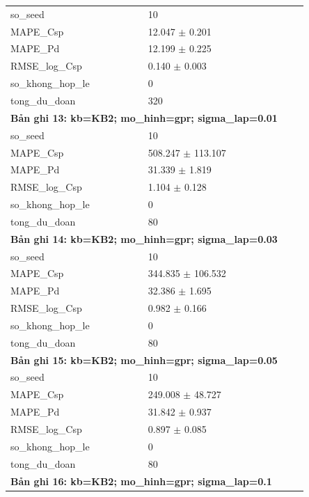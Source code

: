 \begin{longtable}{p{0.43\linewidth}p{0.50\linewidth}}
so\_\allowbreak seed & 10 \\
MAPE\_\allowbreak Csp & 12.047 $\pm$ 0.201 \\
MAPE\_\allowbreak Pd & 12.199 $\pm$ 0.225 \\
RMSE\_\allowbreak log\_\allowbreak Csp & 0.140 $\pm$ 0.003 \\
so\_\allowbreak khong\_\allowbreak hop\_\allowbreak le & 0 \\
tong\_\allowbreak du\_\allowbreak doan & 320 \\
\midrule
\multicolumn{2}{p{0.95\linewidth}}{\textbf{Bản ghi 13: kb=KB2; mo\_hinh=gpr; sigma\_lap=0.01}} \\
so\_\allowbreak seed & 10 \\
MAPE\_\allowbreak Csp & 508.247 $\pm$ 113.107 \\
MAPE\_\allowbreak Pd & 31.339 $\pm$ 1.819 \\
RMSE\_\allowbreak log\_\allowbreak Csp & 1.104 $\pm$ 0.128 \\
so\_\allowbreak khong\_\allowbreak hop\_\allowbreak le & 0 \\
tong\_\allowbreak du\_\allowbreak doan & 80 \\
\midrule
\multicolumn{2}{p{0.95\linewidth}}{\textbf{Bản ghi 14: kb=KB2; mo\_hinh=gpr; sigma\_lap=0.03}} \\
so\_\allowbreak seed & 10 \\
MAPE\_\allowbreak Csp & 344.835 $\pm$ 106.532 \\
MAPE\_\allowbreak Pd & 32.386 $\pm$ 1.695 \\
RMSE\_\allowbreak log\_\allowbreak Csp & 0.982 $\pm$ 0.166 \\
so\_\allowbreak khong\_\allowbreak hop\_\allowbreak le & 0 \\
tong\_\allowbreak du\_\allowbreak doan & 80 \\
\midrule
\multicolumn{2}{p{0.95\linewidth}}{\textbf{Bản ghi 15: kb=KB2; mo\_hinh=gpr; sigma\_lap=0.05}} \\
so\_\allowbreak seed & 10 \\
MAPE\_\allowbreak Csp & 249.008 $\pm$ 48.727 \\
MAPE\_\allowbreak Pd & 31.842 $\pm$ 0.937 \\
RMSE\_\allowbreak log\_\allowbreak Csp & 0.897 $\pm$ 0.085 \\
so\_\allowbreak khong\_\allowbreak hop\_\allowbreak le & 0 \\
tong\_\allowbreak du\_\allowbreak doan & 80 \\
\midrule
\multicolumn{2}{p{0.95\linewidth}}{\textbf{Bản ghi 16: kb=KB2; mo\_hinh=gpr; sigma\_lap=0.1}} \\

\end{longtable}
